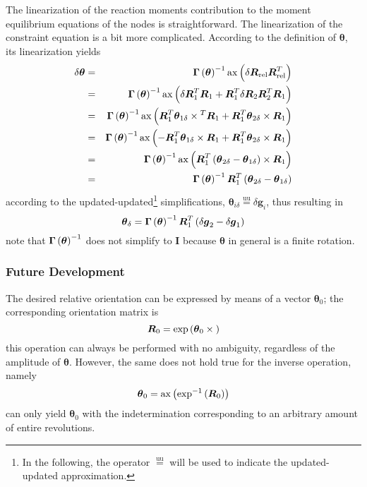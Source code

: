 \documentclass[10pt,dvips,fleqn]{report}
\newcommand{\T}[1]{\boldsymbol{#1}}
\newcommand{\equu}{\overset{\mathrm{uu}}{=}}
\begin{document}
The linearization of the reaction moments contribution 
to the moment equilibrium equations of the nodes is straightforward.
The linearization of the constraint equation is a bit more complicated.
According to the definition of $\T{\theta}$, its linearization
yields
\begin{eqnarray*}
	\delta\T{\theta}
		& = & \T{\Gamma}\plbr{\T{\theta}}^{-1} 
			\llk{ax}\plbr{\delta\T{R}_{\text{rel}} \T{R}_{\text{rel}}^T} \\
		& = & \T{\Gamma}\plbr{\T{\theta}}^{-1} \llk{ax}\plbr{
			\delta\T{R}_1^T \T{R}_1
			+ \T{R}_1^T \delta\T{R}_2 \T{R}_2^T \T{R}_1
		} \\
		& = & \T{\Gamma}\plbr{\T{\theta}}^{-1} \llk{ax}\plbr{
			\T{R}_1^T \T{\theta}_{1\delta}\times{}^T \T{R}_1
			+ \T{R}_1^T \T{\theta}_{2\delta}\times{} \T{R}_1
		} \\
		& = & \T{\Gamma}\plbr{\T{\theta}}^{-1} \llk{ax}\plbr{
			- \T{R}_1^T \T{\theta}_{1\delta}\times{} \T{R}_1
			+ \T{R}_1^T \T{\theta}_{2\delta}\times{} \T{R}_1
		} \\
		& = & \T{\Gamma}\plbr{\T{\theta}}^{-1}
			\llk{ax} \plbr{
				\T{R}_1^T \plbr{
					\T{\theta}_{2\delta}
					- \T{\theta}_{1\delta}
				}\times \T{R}_1
			} \\
		& = & \T{\Gamma}\plbr{\T{\theta}}^{-1} \T{R}_1^T \plbr{
			\T{\theta}_{2\delta} - \T{\theta}_{1\delta}
		}
\end{eqnarray*}
according to the updated-updated\footnote{In the following, 
the operator $\equu$ will be used to indicate the updated-updated
approximation.} simplifications,
$\T{\theta}_{i\delta}\equu\delta\T{g}_i$, thus resulting in
\begin{equation}
	\T{\theta}_{\delta} = \T{\Gamma}\plbr{\T{\theta}}^{-1} \T{R}_1^T \plbr{
		\delta\T{g}_2 - \delta\T{g}_1
	}
	\label{eq:DRIVE-HINGE-theta-delta}
\end{equation}
note that $\T{\Gamma}\plbr{\T{\theta}}^{-1}$ does not simplify to $\T{I}$
because $\T{\theta}$ in general is a finite rotation.





\subsubsection{Future Development}
The desired relative orientation can be expressed by means of a vector 
$\T{\theta}_0$; the corresponding orientation matrix is
\begin{equation}
	\T{R}_0 = \exp\plbr{\T{\theta}_0\times{}}
\end{equation}
this operation can always be performed with no ambiguity,
regardless of the amplitude of $\T{\theta}$.
However, the same does not hold true for the inverse operation,
namely
\begin{equation}
	\T{\theta}_0 = \mathrm{ax}\plbr{\exp^{-1}\plbr{\T{R}_0}}
\end{equation}
can only yield $\T{\theta}_0$ with the indetermination corresponding
to an arbitrary amount of entire revolutions.
\end{document}
